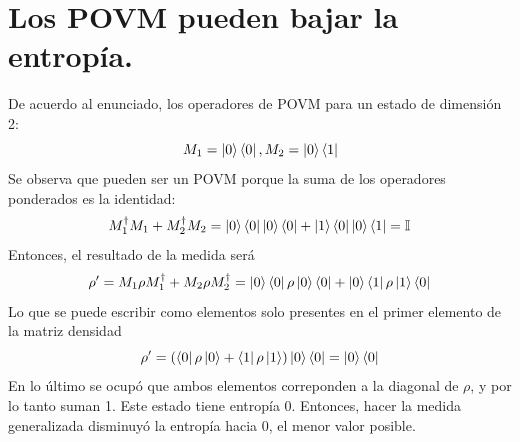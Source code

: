\documentclass{book}
\begin{document}
\section{{Los POVM pueden bajar la entropía.}} De acuerdo al enunciado, los operadores de POVM para un estado de dimensión 2:
\begin{equation}\label{eq8.75}{M_1=\ket{0}\bra{0}, M_2=\ket{0}\bra{1}}\end{equation}
Se observa que pueden ser un POVM porque la suma de los operadores ponderados es la identidad:
\begin{equation}\label{eq8.76}{M_1^\dag M_1+M_2^\dag M_2=\ket{0}\bra{0}\ket{0}\bra{0}+\ket{1}\bra{0}\ket{0}\bra{1}=\mathbb{I}}\end{equation}
Entonces, el resultado de la medida será
\begin{equation}\label{eq8.77}{\rho^\prime=M_1\rho M_1^\dag+M_2\rho M_2^\dag=\ket{0}\bra{0}\rho\ket{0}\bra{0}+\ket{0}\bra{1}\rho\ket{1}\bra{0}
}\end{equation}
Lo que se puede escribir como elementos solo presentes en el primer elemento de la matriz densidad
\begin{equation}\label{eq8.78}{\rho^\prime=(\bra{0}\rho\ket{0}+\bra{1}\rho\ket{1})\ket{0}\bra{0}=\ket{0}\bra{0}}\end{equation}
En lo último se ocupó que ambos elementos correponden a la diagonal de $\rho$, y por lo tanto suman 1. Este estado tiene entropía 0. Entonces, hacer la medida generalizada disminuyó la entropía hacia 0, el menor valor posible.
\end{document}
